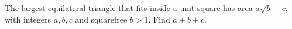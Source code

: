 The largest equilateral triangle that fits inside a unit square has area $a\sqrt b-c$, with integers $a,b,c$ and squarefree $b>1$. Find $a+b+c$.
